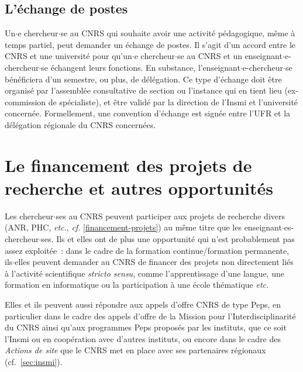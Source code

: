 \subsection{L'\'echange de postes} \label{echgecnrs}

Un$\cdot$e chercheur$\cdot$se au CNRS qui souhaite avoir une activit\'{e}
p\'{e}dagogique, m\^{e}me \`{a} temps partiel, peut demander un
\'{e}change de postes. Il s'agit d'un accord entre le CNRS et une
universit\'{e} pour qu'un$\cdot$e chercheur$\cdot$se au CNRS et un
enseignant$\cdot$e-chercheur$\cdot$se \'{e}changent leurs fonctions. En substance,
l'enseignant$\cdot$e-chercheur$\cdot$se b\'{e}n\'{e}ficiera d'un semestre, ou plus,
de d\'{e}l\'{e}gation.  Ce type d'\'echange doit \^etre organis\'e par l'assembl\'ee
consultative de section ou l'instance qui en tient lieu
(ex-commission de sp\'ecialiste), et \^etre valid\'e par la direction de
l'Insmi et l'universit\'e concern\'ee. Formellement, une convention
d'\'echange est sign\'ee entre l'UFR et la d\'el\'egation r\'egionale du
CNRS concern\'ees.


\section{Le financement des projets de recherche et autres
opportunit\'es}

Les chercheur$\cdot$ses au CNRS peuvent participer aux projets de recherche
divers (ANR, PHC, {\em etc.}, {\em cf.} \ref{financement-projets})
au m\^eme titre que les enseignant$\cdot$es-chercheur$\cdot$ses.
Ils et elles ont de plus une opportunit\'e qui n'est probablement pas
assez exploit\'ee~: dans le cadre de la formation continue/formation permanente, ils$\cdot$elles
peuvent demander au CNRS de financer des projets non directement
li\'es \`a l'activit\'e scientifique {\em stricto sensu},
comme l'apprentissage d'une langue, une formation en informatique ou
 la participation \`a une \'ecole th\'ematique
{\em etc.}

Elles et ils peuvent aussi r\'epondre aux appels d'offre CNRS de type Peps, en particulier dans le cadre des appels d'offre de la Mission pour l'Interdisciplinarit\'e du CNRS ainsi qu'aux programmes Peps propos\'es par les instituts, que ce soit l'Insmi ou en coop\'eration avec d'autres instituts, ou encore dans le cadre des {\it Actions de site} que le CNRS met en place avec ses partenaires r\'egionaux (cf.~\ref{sec:insmi}). 



